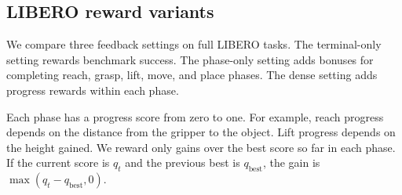 \subsection{LIBERO reward variants}\label{sec:dense_method}
We compare three feedback settings on full LIBERO tasks. The terminal-only setting rewards benchmark success. The phase-only setting adds bonuses for completing reach, grasp, lift, move, and place phases. The dense setting adds progress rewards within each phase.

Each phase has a progress score from zero to one. For example, reach progress depends on the distance from the gripper to the object. Lift progress depends on the height gained. We reward only gains over the best score so far in each phase. If the current score is $q_t$ and the previous best is $q_{\mathrm{best}}$, the gain is $\max(q_t-q_{\mathrm{best}},0)$.
